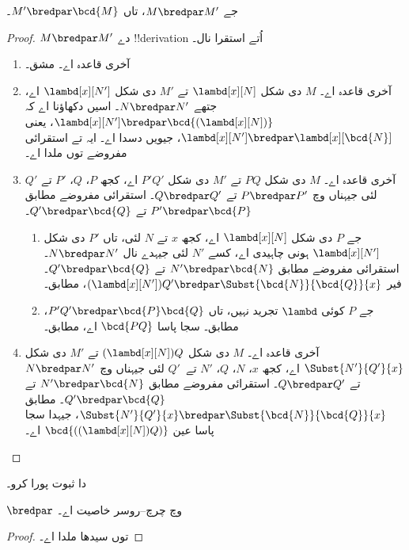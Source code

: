 \documentclass[../../../include/open-logic-section]{subfiles}
\begin{document}
\begin{lem}
  جے $M \bredpar M'$، تاں $M' \bredpar \bcd{M}$۔
\end{lem}
\begin{proof}
  $M \bredpar M'$ دے !!{derivation} اُتے استقرا نال۔
  \begin{enumerate}
    \item آخری قاعدہ  اے۔ مشق۔
    \item آخری قاعدہ  اے۔ $M$ دی شکل
      $\lambd[x][N]$ تے $M'$ دی شکل $\lambd[x][N']$ اے، جتھے
      $N \bredpar N'$۔ اسیں دکھاؤنا اے کہ $\lambd[x][N'] \bredpar
      \bcd{(\lambd[x][N])}$، یعنی $\lambd[x][N'] \bredpar
      \lambd[x][\bcd{N}]$، جیویں  دسدا اے۔
      ایہ  تے استقرائی مفروضے توں ملدا اے۔
    \item آخری قاعدہ  اے۔ $M$ دی شکل $PQ$
      تے $M'$ دی شکل $P'Q'$ اے، کجھ $P$، $Q$، $P'$ تے $Q'$ لئی
      جیہناں وچ $P \bredpar P'$ تے $Q \bredpar Q'$۔
      استقرائی مفروضے مطابق $P'
      \bredpar \bcd{P}$ تے $Q' \bredpar \bcd{Q}$۔
      \begin{enumerate}
        \item جے $P$ دی شکل $\lambd[x][N]$ اے، کجھ $x$ تے $N$ لئی،
          تاں $P'$ دی شکل $\lambd[x][N']$ ہونی چاہیدی اے، کسے
          $N'$ لئی جیہدے نال $N \bredpar N'$۔ استقرائی مفروضے
          مطابق $N' \bredpar \bcd{N}$ تے $Q' \bredpar \bcd{Q}$۔
          فیر $(\lambd[x][N'])Q' \bredpar
          \Subst{\bcd{N}}{\bcd{Q}}{x}$،  مطابق۔
        \item جے $P$ کوئی $\lambd$ تجرید نہیں، تاں $P'Q' \bredpar
          \bcd{P}\bcd{Q}$،  مطابق۔ سجا
          پاسا $ \bcd{PQ}$ اے،  مطابق۔
      \end{enumerate}
    \item آخری قاعدہ  اے۔ $M$ دی شکل
      $(\lambd[x][N])Q$ تے $M'$ دی شکل $\Subst{N'}{Q'}{x}$ اے،
      کجھ $x$، $N$، $Q$، $N'$ تے~$Q'$ لئی جیہناں وچ
      $N \bredpar N'$ تے $Q \bredpar
      Q'$۔ استقرائی مفروضے مطابق $N' \bredpar \bcd{N}$ تے
      $Q' \bredpar \bcd{Q}$۔  مطابق
      $\Subst{N'}{Q'}{x} \bredpar \Subst{\bcd{N}}{\bcd{Q}}{x}$،
      جیہدا سجا پاسا عین $\bcd{((\lambd[x][N])Q)}$ اے۔
  \end{enumerate}
\end{proof}

\begin{prob}
   دا ثبوت پورا کرو۔
\end{prob}

\begin{thm}
  $\bredpar$ وچ چرچ–روسر خاصیت اے۔
\end{thm}

\begin{proof}
   توں سیدھا ملدا اے۔
\end{proof}
\end{document}
